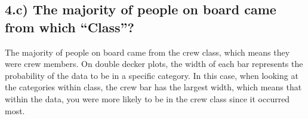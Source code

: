 \documentclass[11pt]{article}
\begin{document}
\subsection*{4.c) The majority of people on board came from which “Class”?}
The majority of people on board came from the crew class, which means they were crew members. On double decker plots, the width of each bar represents the probability of the data to be in a specific category. In this case, when looking at the categories within class, the crew bar has the largest width, which means that within the data, you were more likely to be in the crew class since it occurred most.
\end{document}
